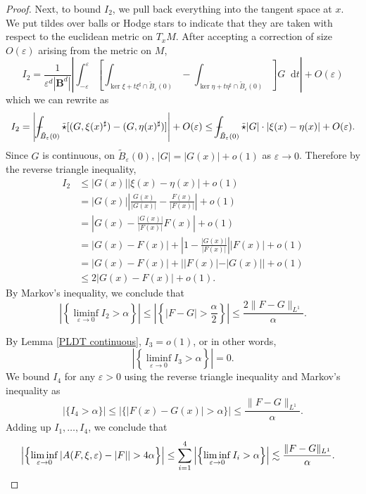 \documentclass[reqno,11pt]{amsart}
\newcommand{\Ball}{\mathbf{B}}
\newcommand*\dif{\mathop{}\!\mathrm{d}}
\theoremstyle{definition}
\numberwithin{equation}{section}
\def\Xint#1{\mathchoice
{\XXint\displaystyle\textstyle{#1}}%
{\XXint\textstyle\scriptstyle{#1}}%
{\XXint\scriptstyle\scriptscriptstyle{#1}}%
{\XXint\scriptscriptstyle\scriptscriptstyle{#1}}%
\!\int}
\def\XXint#1#2#3{{\setbox0=\hbox{$#1{#2#3}{\int}$ }
\vcenter{\hbox{$#2#3$ }}\kern-.6\wd0}}
\def\dashint{\Xint-}
\begin{document}
\begin{proof}
Next, to bound $I_2$, we pull back everything into the tangent space at $x$.
We put tildes over balls or Hodge stars to indicate that they are taken with respect to the euclidean metric on $T_x M$.
After accepting a correction of size $O(\varepsilon)$ arising from the metric on $M$, 
$$I_2 = \frac{1}{\varepsilon^d |\Ball^d|} \left|\int_{-\varepsilon}^\varepsilon \left[\int_{\ker \xi + t\xi^\sharp \cap \tilde B_\varepsilon(0)} - \int_{\ker \eta + t\eta^\sharp \cap \tilde B_\varepsilon(0)}\right] G \dif t\right| + O(\varepsilon)$$
which we can rewrite as
$$I_2 = \left|\dashint_{\tilde B_\varepsilon(0)} \tilde \star [(G, \xi(x)^\sharp) - (G, \eta(x)^\sharp)]\right| + O(\varepsilon) \leq \dashint_{\tilde B_\varepsilon(0)} \tilde \star |G| \cdot |\xi(x) - \eta(x)| + O(\varepsilon).$$
Since $G$ is continuous, on $\tilde B_\varepsilon(0)$, $|G| = |G(x)| + o(1)$ as $\varepsilon \to 0$.
Therefore by the reverse triangle inequality,
\begin{align*}
I_2
&\leq |G(x)| |\xi(x) - \eta(x)| + o(1) \\
&= |G(x)| \left|\frac{G(x)}{|G(x)|} - \frac{F(x)}{|F(x)|}\right| + o(1) \\
&= \left|G(x) - \frac{|G(x)|}{|F(x)|} F(x)\right| + o(1) \\
&= |G(x) - F(x)| + \left|1 - \frac{|G(x)|}{|F(x)|}\right| |F(x)| + o(1)\\
&= |G(x) - F(x)| + ||F(x)| - |G(x)|| + o(1) \\
&\leq 2|G(x) - F(x)| + o(1).
\end{align*}
By Markov's inequality, we conclude that 
$$\left|\left\{\liminf_{\varepsilon \to 0} I_2 > \alpha\right\}\right| \leq \left|\left\{|F - G| > \frac{\alpha}{2}\right\}\right| \leq \frac{2\|F - G\|_{L^1}}{\alpha}.$$

By Lemma \ref{PLDT continuous}, $I_3 = o(1)$, or in other words,
$$\left|\left\{\liminf_{\varepsilon \to 0} I_3 > \alpha\right\}\right| = 0.$$
We bound $I_4$ for any $\varepsilon > 0$ using the reverse triangle inequality and Markov's inequality as 
$$|\{I_4 > \alpha\}| \leq |\{|F(x) - G(x)| > \alpha\}| \leq \frac{\|F - G\|_{L^1}}{\alpha}.$$
Adding up $I_1, \dots, I_4$, we conclude that 
\begin{align*}
\left|\left\{\liminf_{\varepsilon \to 0} |A(F, \xi, \varepsilon) - |F|| > 4\alpha\right\}\right| \leq \sum_{i=1}^4 \left|\left\{\liminf_{\varepsilon \to 0} I_i > \alpha\right\}\right| &\lesssim \frac{\|F - G\|_{L^1}}{\alpha}. \qedhere 
\end{align*}
\end{proof}
\end{document}
